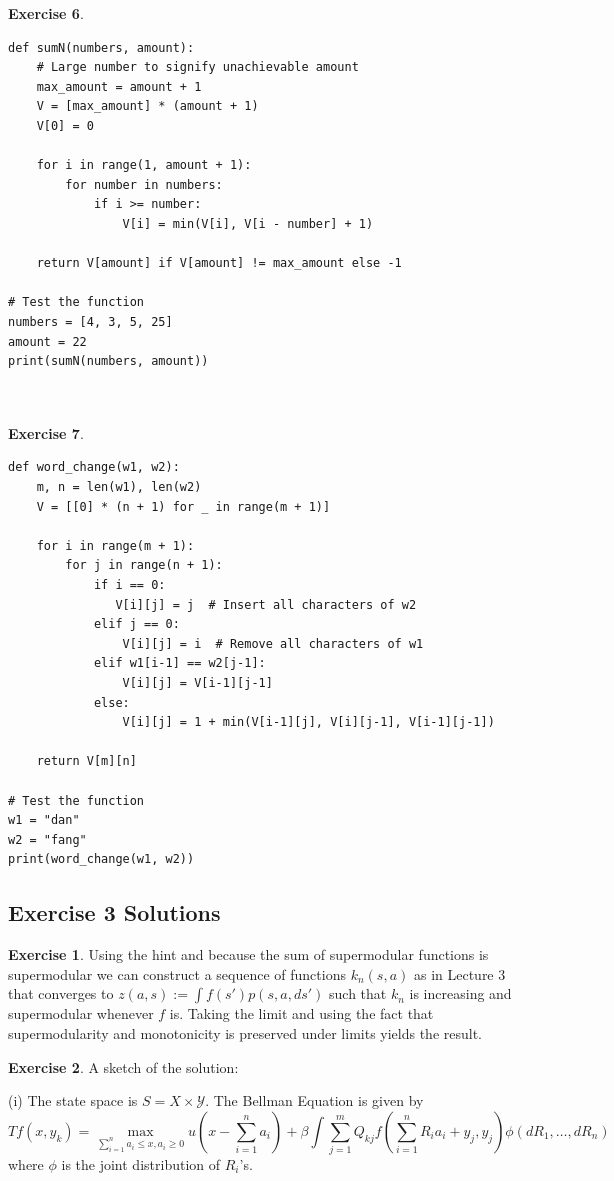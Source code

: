 \documentclass[letter,11pt]{article}
\begin{document}
\textbf{Exercise 6}.
\begin{verbatim}
def sumN(numbers, amount):
    # Large number to signify unachievable amount
    max_amount = amount + 1
    V = [max_amount] * (amount + 1)
    V[0] = 0
    
    for i in range(1, amount + 1):
        for number in numbers:
            if i >= number:
                V[i] = min(V[i], V[i - number] + 1)
    
    return V[amount] if V[amount] != max_amount else -1

# Test the function
numbers = [4, 3, 5, 25]
amount = 22
print(sumN(numbers, amount))  



\end{verbatim}


   \textbf{Exercise 7}.

\begin{verbatim}
def word_change(w1, w2):
    m, n = len(w1), len(w2)
    V = [[0] * (n + 1) for _ in range(m + 1)]

    for i in range(m + 1):
        for j in range(n + 1):
            if i == 0:
               V[i][j] = j  # Insert all characters of w2
            elif j == 0:
                V[i][j] = i  # Remove all characters of w1
            elif w1[i-1] == w2[j-1]:
                V[i][j] = V[i-1][j-1]
            else:
                V[i][j] = 1 + min(V[i-1][j], V[i][j-1], V[i-1][j-1])

    return V[m][n]

# Test the function
w1 = "dan"
w2 = "fang"
print(word_change(w1, w2))  

\end{verbatim}


\subsection{Exercise 3 Solutions}


\textbf{Exercise 1}.
Using the hint and because the sum of supermodular functions is supermodular we can construct a sequence of functions $k_{n}(s,a)$ as in Lecture 3  that converges to $z(a,s) := \int f(s')p(s,a,ds')$ such that $k_{n}$ is increasing and supermodular whenever $f$ is. Taking the limit and using the fact that supermodularity and monotonicity is preserved under limits yields the result. 


\textbf{Exercise 2}.
A sketch of the solution: 

(i) The state space is $S = X \times \mathcal{Y}$. The Bellman Equation is given by 
$$Tf(x,y_{k}) = \max _{\sum_{i=1}^{n} a_{i} \leq x, a_{i} \geq 0} u \left (x- \sum_{i=1}^{n} a_{i} \right ) + \beta \int  \sum _{j=1}^{m} Q_{kj} f \left ( \sum_{i=1}^{n} R_{i} a_{i} +y_{j} , y_{j} \right ) \phi(dR_{1},\ldots,dR_{n})$$
where $\phi$ is the joint distribution of $R_{i}$'s. 
\end{document}
